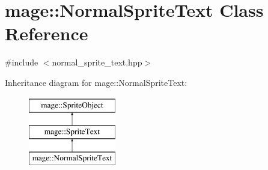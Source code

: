 \hypertarget{classmage_1_1_normal_sprite_text}{}\section{mage\+:\+:Normal\+Sprite\+Text Class Reference}
\label{classmage_1_1_normal_sprite_text}


{\ttfamily \#include $<$normal\+\_\+sprite\+\_\+text.\+hpp$>$}

Inheritance diagram for mage\+:\+:Normal\+Sprite\+Text\+:\begin{figure}[H]
\begin{center}
\leavevmode
\includegraphics[height=3.000000cm]{classmage_1_1_normal_sprite_text}
\end{center}
\end{figure}
